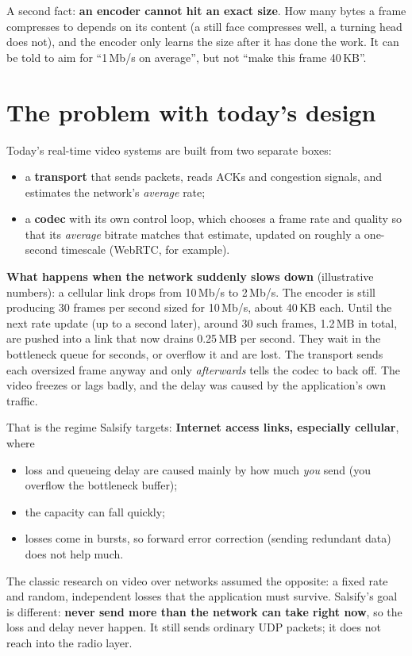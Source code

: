 A second fact: \textbf{an encoder cannot hit an exact size}. How many bytes a frame compresses to depends on its content (a still face compresses
well, a turning head does not), and the encoder only learns the size after it has done the work. It can be told to aim for ``1\,Mb/s on average'',
but not ``make this frame 40\,KB''.

\section{The problem with today's design}

Today's real-time video systems are built from two separate boxes:
\begin{itemize}
  \item a \textbf{transport} that sends packets, reads ACKs and congestion signals, and estimates the network's \emph{average} rate;
  \item a \textbf{codec} with its own control loop, which chooses a frame rate and quality so that its \emph{average} bitrate matches that estimate,
        updated on roughly a one-second timescale (WebRTC, for example).
\end{itemize}

\textbf{What happens when the network suddenly slows down} (illustrative numbers): a cellular link drops from 10\,Mb/s to 2\,Mb/s. The encoder is
still producing 30 frames per second sized for 10\,Mb/s, about 40\,KB each. Until the next rate update (up to a second later), around 30 such frames,
1.2\,MB in total, are pushed into a link that now drains 0.25\,MB per second. They wait in the bottleneck queue for seconds, or overflow it and are
lost. The transport sends each oversized frame anyway and only \emph{afterwards} tells the codec to back off. The video freezes or lags badly, and
the delay was caused by the application's own traffic.

That is the regime Salsify targets: \textbf{Internet access links, especially cellular}, where
\begin{itemize}
  \item loss and queueing delay are caused mainly by how much \emph{you} send (you overflow the bottleneck buffer);
  \item the capacity can fall quickly;
  \item losses come in bursts, so forward error correction (sending redundant data) does not help much.
\end{itemize}
The classic research on video over networks assumed the opposite: a fixed rate and random, independent losses that the application must survive.
Salsify's goal is different: \textbf{never send more than the network can take right now}, so the loss and delay never happen. It still sends ordinary
UDP packets; it does not reach into the radio layer.

